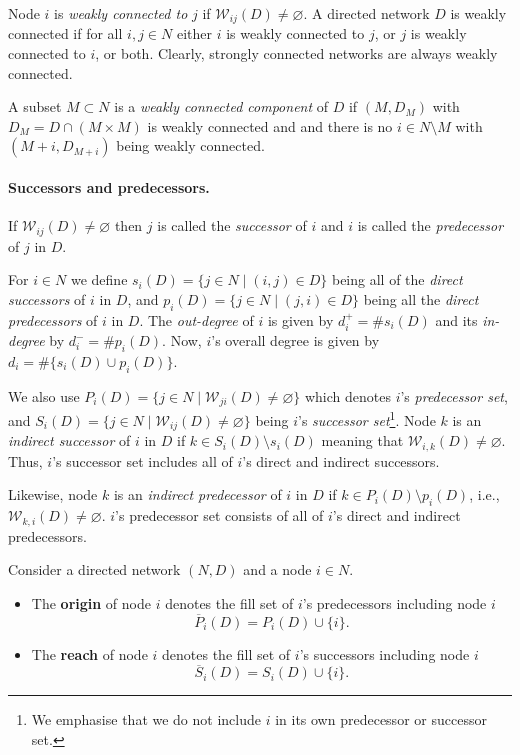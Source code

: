 Node $i$ is \textit{weakly connected to} $j$ if $\mathcal{W}_{ij}(D) \neq \varnothing$. A directed network $D$ is weakly connected if for all $i,j \in N$ either $i$ is weakly connected to $j$, or $j$ is weakly connected to $i$, or both. Clearly, strongly connected networks are always weakly connected.

A subset $M \subset N$ is a \emph{weakly connected component} of $D$ if $(M, D_M)$ with $D_M = D \cap (M \times M)$ is weakly connected and and there is no $i \in N \setminus M$ with $(M+i, D_{M+i})$ being weakly connected.

\paragraph{Successors and predecessors.}

If $\mathcal{W}_{ij} (D) \neq \varnothing$ then $j$ is called the \textit{successor} of $i$ and $i$ is called the \textit{predecessor} of $j$ in $D$.

For $i \in N$ we define $s_{i}(D) = \{ j \in N \mid (i,j) \in D \}$ being all of the \textit{direct successors} of $i$ in $D$, and $p_{i}(D)=\{j \in N \mid (j,i) \in D\}$ being all the \textit{direct predecessors} of $i$ in $D$. The \emph{out-degree} of $i$ is given by $d_{i}^{+} = \# s_{i}(D)$ and its \emph{in-degree} by $d_{i}^{-}= \# p_{i}(D)$. Now, $i$'s overall degree is given by $d_{i} = \# \{ s_{i} (D) \cup p_{i} (D) \}$.

We also use $P_{i}(D)=\{j \in N \mid \mathcal{W}_{ji}(D) \neq \varnothing \}$ which denotes $i$'s \textit{predecessor set}, and $S_{i}(D)= \{j \in N \mid \mathcal{W}_{ij}(D) \neq \varnothing \}$ being $i$'s \textit{successor set}\footnote{We emphasise that we do not include $i$ in its own predecessor or successor set.}. Node $k$ is an \emph{indirect successor} of $i$ in $D$ if $k \in S_{i}(D) \setminus s_i (D)$ meaning that $\mathcal{W}_{i,k}(D) \neq \varnothing$. Thus, $i$'s successor set includes all of $i$'s direct and indirect successors.

Likewise, node $k$ is an \emph{indirect predecessor} of $i$ in $D$ if $k \in P_{i}(D) \setminus p_{i}(D)$, i.e., $\mathcal{W}_{k,i}(D) \neq \varnothing$. $i$'s predecessor set consists of all of $i$'s direct and indirect predecessors.

\begin{definition} \label{coverage}
Consider a directed network $(N,D)$ and a node $i \in N$.
\begin{itemize}
\item The \textbf{origin} of node $i$ denotes the fill set of $i$'s predecessors including node $i$
\begin{equation}
\overline{P}_{i}(D) = P_{i}(D) \cup \{i\}.
\end{equation}
\item The \textbf{reach} of node $i$ denotes the fill set of $i$'s successors including node $i$
\begin{equation}
\overline{S}_{i}(D) = S_{i}(D) \cup \{i\}.
\end{equation}
\end{itemize}
\end{definition}

